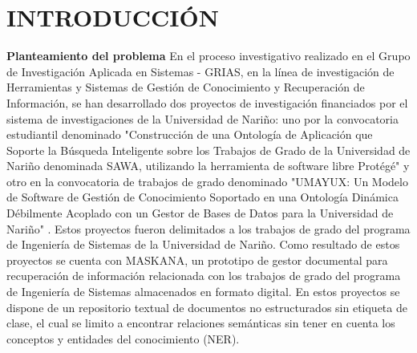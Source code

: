 


\chapter{INTRODUCCIÓN}

\textbf{Planteamiento del problema}
En el proceso investigativo realizado en el Grupo de Investigación Aplicada en Sistemas -  GRIAS,  en  la  línea  de  
investigación  de  Herramientas  y  Sistemas  de  Gestión  de Conocimiento  y  Recuperación  de  Información,
se  han  desarrollado  dos  proyectos  de investigación financiados por el sistema de investigaciones de la Universidad de Nariño: uno
por  la  convocatoria  estudiantil  denominado  "Construcción  de  una  Ontología  de Aplicación  que  Soporte 
la  Búsqueda  Inteligente  sobre  los  Trabajos  de  Grado  de  la Universidad  de  Nariño  denominada  SAWA,  utilizando 
la  herramienta  de  software  libre Protégé" \cite{cabrera2015swa} y otro en la convocatoria de trabajos de grado denominado
"UMAYUX: Un Modelo de Software de Gestión de Conocimiento Soportado en una Ontología Dinámica Débilmente Acoplado con un 
Gestor de Bases de Datos para la Universidad de Nariño" \cite{restrepo2015maskana}.  Estos  proyectos  fueron  delimitados  a  los  trabajos  de  grado 
del  programa  de Ingeniería de Sistemas de la Universidad de Nariño. Como resultado de estos proyectos se  cuenta  con  MASKANA, 
un  prototipo  de  gestor  documental  para  recuperación  de información  relacionada  con 
los  trabajos  de  grado  del  programa  de  Ingeniería  de Sistemas  almacenados  en  formato  digital.  En estos proyectos se dispone 
de un repositorio textual de documentos no estructurados sin etiqueta de  clase, el cual se limito a encontrar relaciones semánticas
sin tener en cuenta los conceptos y entidades del conocimiento (NER).

